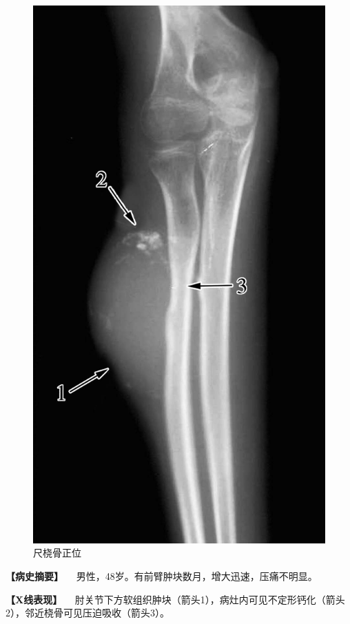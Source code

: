 \begin{figure}[!htbp]
 \centering
 \includegraphics{./images/Image00105.jpg}
 \captionsetup{justification=centering}
 \caption{尺桡骨正位}
 \label{fig2-7-20}
  \end{figure} 

\textbf{【病史摘要】}
　男性，48岁。有前臂肿块数月，增大迅速，压痛不明显。

\textbf{【X线表现】}
　肘关节下方软组织肿块（箭头1），病灶内可见不定形钙化（箭头2），邻近桡骨可见压迫吸收（箭头3）。


